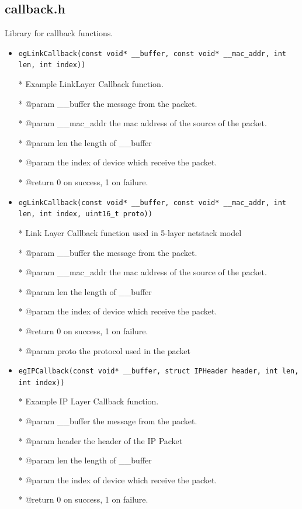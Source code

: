 \documentclass[11pt]{article}
\begin{document}
	\subsection*{callback.h}
	
	\par Library for callback functions.
	\begin{itemize}
		\item \texttt{egLinkCallback(const void* \_\_buffer, const void* \_\_mac\_addr, int len, int index))}
		
		* Example LinkLayer Callback function.
		
		* @param \_\_buffer the message from the packet.
		
		* @param \_\_mac\_addr the mac address of the source of the packet.
		
		* @param len the length of \_\_buffer
		
		* @param the index of device which receive the packet.
		
		* @return 0 on success, 1 on failure.
		
		
		\item \texttt{egLinkCallback(const void* \_\_buffer, const void* \_\_mac\_addr, int len, int index, uint16\_t proto))}
		
		* Link Layer Callback function used in 5-layer netstack model
		
		* @param \_\_buffer the message from the packet.
		
		* @param \_\_mac\_addr the mac address of the source of the packet.
		
		* @param len the length of \_\_buffer
		
		* @param the index of device which receive the packet.
		
		* @return 0 on success, 1 on failure.
		
		* @param proto the protocol used in the packet
		
		\item \texttt{egIPCallback(const void* \_\_buffer, struct IPHeader header, int len, int index))}
		
		* Example IP Layer Callback function.
		
		* @param \_\_buffer the message from the packet.
		
		* @param header the header of the IP Packet
		
		* @param len the length of \_\_buffer
		
		* @param the index of device which receive the packet.
		
		* @return 0 on success, 1 on failure.
	\end{itemize}
	
\end{document}
